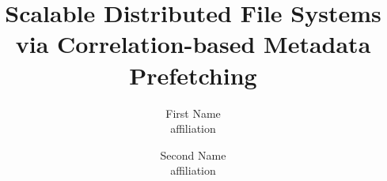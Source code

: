 \documentclass[letterpaper,twocolumn,10pt]{article}
\begin{document}
\date{}

\title{\Large \bf Scalable Distributed File Systems via Correlation-based Metadata Prefetching}

\author{
{\rm First Name}\\
affiliation
\and
{\rm Second Name}\\
affiliation
}

\maketitle

\thispagestyle{empty}











\begin{footnotesize}
%


\end{footnotesize}
\end{document}
